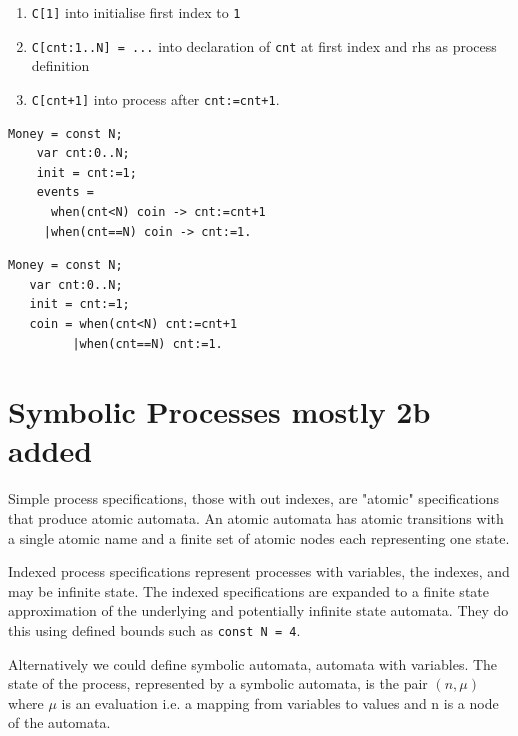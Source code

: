\documentclass[]{article}
\begin{document}
{\begin{minipage}{0.45\textwidth}
 \end{minipage}




\begin{enumerate}
\item \verb|C[1]| into initialise first index to \verb|1|
\item  \verb|C[cnt:1..N] = ...|  into declaration of \verb|cnt| at first index and rhs as process definition
\item \verb|C[cnt+1]| into  process after \verb|cnt:=cnt+1|.
\end{enumerate}

\begin{center}\begin{minipage}{0.45\textwidth}
\begin{verbatim}
Money = const N;
    var cnt:0..N;
    init = cnt:=1;
    events =
      when(cnt<N) coin -> cnt:=cnt+1
     |when(cnt==N) coin -> cnt:=1.
\end{verbatim}
\end{minipage}
\begin{minipage}{0.45\textwidth}
\begin{verbatim}
Money = const N;
   var cnt:0..N;
   init = cnt:=1;
   coin = when(cnt<N) cnt:=cnt+1
         |when(cnt==N) cnt:=1.
  \end{verbatim}
\end{minipage} \end{center}
}


\section{ Symbolic Processes  {\color{red} mostly 2b added }}
Simple process specifications, those with out indexes, are "atomic" specifications that produce atomic automata.   An atomic  automata has atomic transitions with  a single atomic name and  a finite set of  atomic  nodes each   representing  one state.

Indexed process specifications represent processes with variables, the indexes, and may be infinite state. The indexed specifications are expanded to a finite state approximation of the underlying and potentially infinite state automata. They do this using defined bounds such as \verb|const N = 4|.


Alternatively we could define symbolic automata, automata with variables.
The state of  the process, represented by a symbolic automata, is   the pair $(n,\mu)$ where $\mu$ is an  evaluation i.e. a mapping from variables to values and n is a node of the automata.
\end{document}
